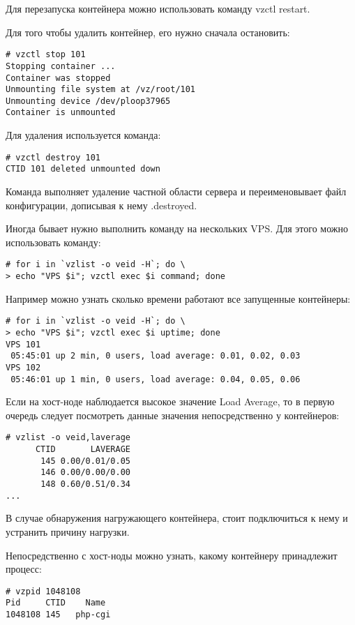 Для перезапуска контейнера можно использовать команду vzctl restart.

Для того чтобы удалить контейнер, его нужно сначала остановить:
\begin{lstlisting}
# vzctl stop 101
Stopping container ...
Container was stopped
Unmounting file system at /vz/root/101
Unmounting device /dev/ploop37965
Container is unmounted
\end{lstlisting}

Для удаления используется команда:
\begin{lstlisting}
# vzctl destroy 101
CTID 101 deleted unmounted down
\end{lstlisting}

Команда выполняет удаление частной области сервера и переименовывает файл конфигурации, дописывая к нему .destroyed.

Иногда бывает нужно выполнить команду на нескольких VPS.
Для этого можно использовать команду:
\begin{lstlisting}
# for i in `vzlist -o veid -H`; do \
> echo "VPS $i"; vzctl exec $i command; done
\end{lstlisting}

Например можно узнать сколько времени работают все запущенные контейнеры:
\begin{lstlisting}
# for i in `vzlist -o veid -H`; do \
> echo "VPS $i"; vzctl exec $i uptime; done
VPS 101
 05:45:01 up 2 min, 0 users, load average: 0.01, 0.02, 0.03
VPS 102
 05:46:01 up 1 min, 0 users, load average: 0.04, 0.05, 0.06
\end{lstlisting}

Если на хост-ноде наблюдается высокое значение Load Average, то в первую очередь следует посмотреть данные значения непосредственно у контейнеров:
\begin{lstlisting}
# vzlist -o veid,laverage
      CTID       LAVERAGE
       145 0.00/0.01/0.05
       146 0.00/0.00/0.00
       148 0.60/0.51/0.34
...
\end{lstlisting}

В случае обнаружения нагружающего контейнера, стоит подключиться к нему и устранить причину нагрузки.

Непосредственно с хост-ноды можно узнать, какому контейнеру принадлежит процесс:
\begin{lstlisting}
# vzpid 1048108
Pid	    CTID	Name
1048108	145	  php-cgi
\end{lstlisting}

